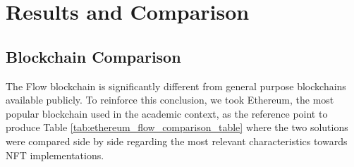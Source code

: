 \documentclass[../NFTComp_IEEE.tex]{subfiles}
\begin{document}
\section{Results and Comparison}
\label{sec:architecture_comparison}

\subsection{Blockchain Comparison}
The Flow blockchain is significantly different from general purpose blockchains available publicly. To reinforce this conclusion, we took Ethereum, the most popular blockchain used in the academic context, as the reference point to produce Table \ref{tab:ethereum_flow_comparison_table} where the two solutions were compared side by side regarding the most relevant characteristics towards NFT implementations.
\end{document}
